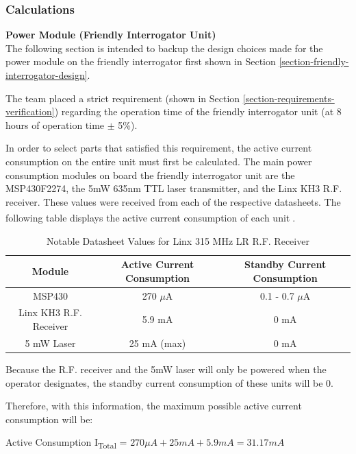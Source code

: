 \documentclass[letterpaper,10pt]{article}
\begin{document}
\begin{spacing}{1.15}
\subsubsection{Calculations}
\normalsize\textbf{Power Module (Friendly Interrogator Unit)} \\
The following section is intended to backup the design choices made for the power module on the friendly interrogator first shown in Section \ref{section-friendly-interrogator-design}.

The team placed a strict requirement (shown in Section \ref{section-requirements-verification}) regarding the operation time of the friendly interrogator unit (at 8 hours of operation time $\pm$ 5\%).

In order to select parts that satisfied this requirement, the active current consumption on the entire unit must first be calculated. The main power consumption modules on board the friendly interrogator unit are the MSP430F2274, the 5mW 635nm TTL laser transmitter, and the Linx KH3 R.F. receiver. These values were received from each of the respective datasheets. The following table displays the active current consumption of each unit\textsuperscript{\cite{MSP430F2274} \cite{Linx-Receiver} \cite{Laser}}. 


\begin{table}[htbp]
	\centering
	\begin{tabular}{c|c|c}	%
		\toprule	%
		Module & Active Current Consumption & Standby Current Consumption\\
		\midrule
		MSP430 & 270 $\mu$A & 0.1 - 0.7 $\mu$A\\ 
		Linx KH3 R.F. Receiver & 5.9 mA & 0 mA\\
		5 mW Laser & 25 mA (max) & 0 mA \\
	\bottomrule	%
	\end{tabular}%
	\caption{Notable Datasheet Values for Linx 315 MHz LR R.F. Receiver}
	\label{tab:table2}	%
\end{table}%

Because the R.F. receiver and the 5mW laser will only be powered when the operator designates, the standby current consumption of these units will be 0.

Therefore, with this information, the maximum possible active current consumption will be:
\begin{center}{Active Consumption I\textsubscript{Total} = $270 \mu A + 25 mA + 5.9 mA = 31.17 mA $}\end{center}


\end{spacing}
\end{document}
